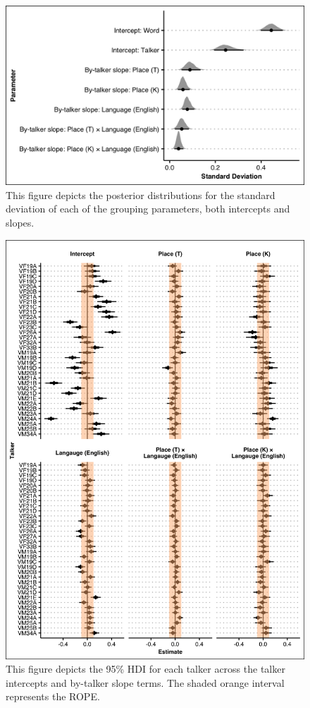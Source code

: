 \begin{figure}[htbp]
  \begin{center}
  \includegraphics[width=\linewidth]{figures/ch4_grppar_5in.png} 
  \caption{This figure depicts the posterior distributions for the standard deviation of each of the grouping parameters, both intercepts and slopes.}
  \label{ch4:fig:grppar}
  \end{center}
\end{figure}

\begin{figure}[htbp]
  \begin{center}
  \includegraphics[width=0.9\linewidth]{figures/ch4_grpparvar_5in.png} 
  \caption{This figure depicts the 95\% HDI for each talker across the talker intercepts and by-talker slope terms. The shaded orange interval represents the ROPE. }
  \label{ch4:fig:grpparvar}
  \end{center}
\end{figure}

